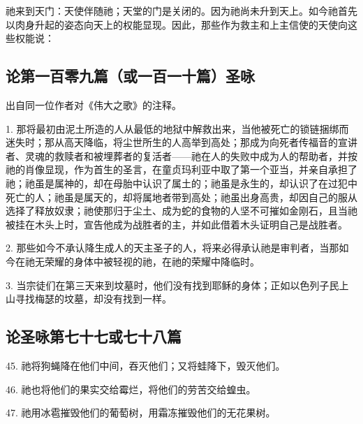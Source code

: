祂来到天门：天使伴随祂；天堂的门是关闭的。因为祂尚未升到天上。如今祂首先以肉身升起的姿态向天上的权能显现。因此，那些作为救主和上主信使的天使向这些权能说：\par


\subsection{论第一百零九篇（或一百一十篇）圣咏}

出自同一位作者对《伟大之歌》的注释。\par

1. 那将最初由泥土所造的人从最低的地狱中解救出来，当他被死亡的锁链捆绑而迷失时；那从高天降临，将尘世所生的人高举到高处；那成为向死者传福音的宣讲者、灵魂的救赎者和被埋葬者的复活者——祂在人的失败中成为人的帮助者，并按祂的肖像显现，作为首生的圣言，在童贞玛利亚中取了第一个亚当，并亲自承担了祂；祂虽是属神的，却在母胎中认识了属土的；祂虽是永生的，却认识了在过犯中死亡的人；祂虽是属天的，却将属地者带到高处；祂虽出身高贵，却因自己的服从选择了释放奴隶；祂使那归于尘土、成为蛇的食物的人坚不可摧如金刚石，且当祂被挂在木头上时，宣告他成为战胜者的主，并如此借着木头证明自己是战胜者。\par

2. 那些如今不承认降生成人的天主圣子的人，将来必得承认祂是审判者，当那如今在祂无荣耀的身体中被轻视的祂，在祂的荣耀中降临时。\par

3. 当宗徒们在第三天来到坟墓时，他们没有找到耶稣的身体；正如以色列子民上山寻找梅瑟的坟墓，却没有找到一样。\par


\subsection{论圣咏第七十七或七十八篇}

45. 祂将狗蝇降在他们中间，吞灭他们；又将蛙降下，毁灭他们。\par

46. 祂也将他们的果实交给霉烂，将他们的劳苦交给蝗虫。\par

47. 祂用冰雹摧毁他们的葡萄树，用霜冻摧毁他们的无花果树。\par

